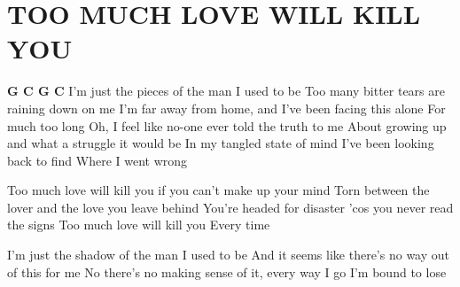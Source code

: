 \documentclass[../../../songbook.tex]{subfiles}
\begin{document}
\TabPositions{10.5cm} %
\section*{TOO MUCH LOVE WILL KILL YOU}
{}
\vspace{0.5cm}
{\color{red}\textbf{G C G C} } \newline
I'm just the pieces of the man I used to be					 \newline
Too many bitter tears are raining down on me				 \newline
I'm far away from home, and I've been facing this alone		 \newline
For much too long											 \newline
Oh, I feel like no-one ever told the truth to me			 \newline
About growing up and what a struggle it would be			 \newline
In my tangled state of mind I've been looking back to find	 \newline
Where I went wrong											 \newline

\-\hspace{1cm} Too much love will kill you if you can't make up your mind	 \newline
\-\hspace{1cm} Torn between the lover	and the love you leave behind		 \newline
\-\hspace{1cm} You're headed for disaster 'cos you never read the signs	 \newline	
\-\hspace{1cm} Too much love will kill you									 \newline
\-\hspace{1cm} Every time													 \newline

I'm just the shadow of the man I used to be							 \newline
And it seems like there's no way out of this for me					 \newline
No there's no making sense of it, every way I go I'm bound to lose	 \newline
			
\end{document}
